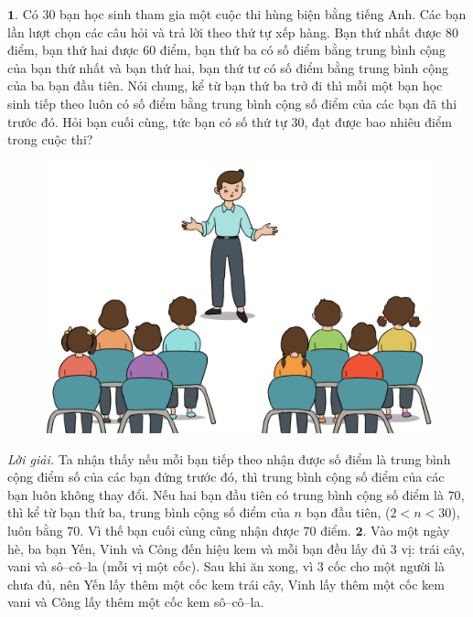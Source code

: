 \begin{multicols}{2}
	$\pmb{1.}$ Có $30$ bạn học sinh tham gia một cuộc thi hùng biện bằng tiếng Anh. Các bạn lần lượt chọn các câu hỏi và trả lời theo thứ tự xếp hàng. Bạn thứ nhất được $80$ điểm, bạn thứ hai được $60$ điểm, bạn thứ ba có số điểm bằng trung bình cộng của bạn thứ nhất và bạn thứ hai, bạn thứ tư có số điểm bằng trung bình cộng của ba bạn đầu tiên. Nói chung, kể từ bạn thứ ba trở đi thì  mỗi một bạn học sinh tiếp theo luôn có số điểm bằng trung bình cộng số điểm của các bạn đã thi trước đó. 
	\vskip 0.1cm
	Hỏi bạn cuối cùng, tức bạn có số thứ tự $30$, đạt được bao nhiêu điểm trong cuộc thi? 
	\begin{figure}[H]
		\centering
		\vspace*{-10pt}
		\captionsetup{labelformat= empty, justification=centering}
		\includegraphics[width=0.92\linewidth]{bai1}
		\vspace*{-10pt}
	\end{figure}
	\textit{Lời giải.} 	Ta nhận thấy nếu mỗi bạn tiếp theo nhận được số điểm là trung bình cộng điểm số của các bạn đứng trước đó, thì trung bình cộng số điểm của các bạn luôn không thay đổi. Nếu hai bạn đầu tiên có trung bình cộng số điểm là $70$, thì kể từ bạn thứ ba, trung bình cộng số điểm của $n$ bạn đầu tiên, ($2\!<\!n\!<\!30$), luôn bằng $70$. Vì thế bạn cuối cùng cũng nhận được $70$ điểm.
	\vskip 0.1cm
	$\pmb{2.}$ Vào một ngày hè, ba bạn Yến, Vinh và Công đến hiệu kem và mỗi bạn đều lấy đủ $3$ vị: trái cây, vani và sô--cô--la (mỗi vị một cốc). Sau khi ăn xong, vì $3$ cốc cho một người là chưa đủ, nên Yến lấy thêm một cốc kem trái cây, Vinh lấy thêm một cốc kem vani và Công lấy thêm một cốc kem sô--cô--la. 
	\begin{figure}[H]
		\centering

\end{figure}
\end{multicols}
